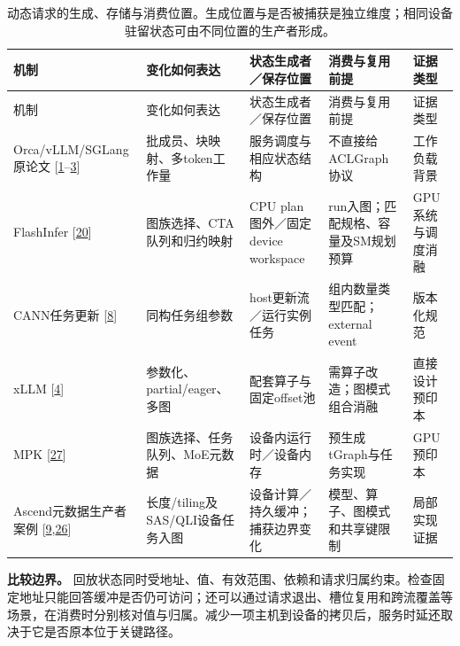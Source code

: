 \documentclass[
  UTF8,
  zihao=5]{ctexart}
\begin{document}
\begin{longtable}[]{@{}
  >{\raggedright\arraybackslash}p{}
  >{\raggedright\arraybackslash}p{}
  >{\raggedright\arraybackslash}p{}
  >{\raggedright\arraybackslash}p{}
  >{\raggedright\arraybackslash}p{}@{}}
\caption{动态请求的生成、存储与消费位置。生成位置与是否被捕获是独立维度；相同设备驻留状态可由不同位置的生产者形成。}\tabularnewline
\toprule
机制 & 变化如何表达 & 状态生成者／保存位置 & 消费与复用前提 &
证据类型 \\
\midrule
\endfirsthead
\toprule
机制 & 变化如何表达 & 状态生成者／保存位置 & 消费与复用前提 &
证据类型 \\
\midrule
\endhead
Orca/vLLM/SGLang原论文
{[}\protect\hyperlink{ref-yu2022orca}{1}--\protect\hyperlink{ref-zheng2024sglang}{3}{]}
& 批成员、块映射、多token工作量 & 服务调度与相应状态结构 &
不直接给ACLGraph协议 & 工作负载背景 \\
FlashInfer {[}\protect\hyperlink{ref-ye2025flashinfer}{20}{]} &
图族选择、CTA队列和归约映射 & CPU plan图外／固定device workspace &
run入图；匹配规格、容量及SM规划预算 & GPU系统与调度消融 \\
CANN任务更新 {[}\protect\hyperlink{ref-cann910update}{8}{]} &
同构任务组参数 & host更新流／运行实例任务 & 组内数量类型匹配；external
event & 版本化规范 \\
xLLM {[}\protect\hyperlink{ref-liu2025xllm}{4}{]} &
参数化、partial/eager、多图 & 配套算子与固定offset池 &
需算子改造；图模式组合消融 & 直接设计预印本 \\
MPK {[}\protect\hyperlink{ref-cheng2026mpk}{27}{]} &
图族选择、任务队列、MoE元数据 & 设备内运行时／设备内存 &
预生成tGraph与任务实现 & GPU预印本 \\
Ascend元数据生产者案例
{[}\protect\hyperlink{ref-vllmascendpr21259}{9},\protect\hyperlink{ref-vllmascendpr21281}{26}{]}
& 长度/tiling及SAS/QLI设备任务入图 & 设备计算／持久缓冲；捕获边界变化 &
模型、算子、图模式和共享键限制 & 局部实现证据 \\
\bottomrule
\end{longtable}

\textbf{比较边界。}
回放状态同时受地址、值、有效范围、依赖和请求归属约束。检查固定地址只能回答缓冲是否仍可访问；还可以通过请求退出、槽位复用和跨流覆盖等场景，在消费时分别核对值与归属。减少一项主机到设备的拷贝后，服务时延还取决于它是否原本位于关键路径。
\end{document}
